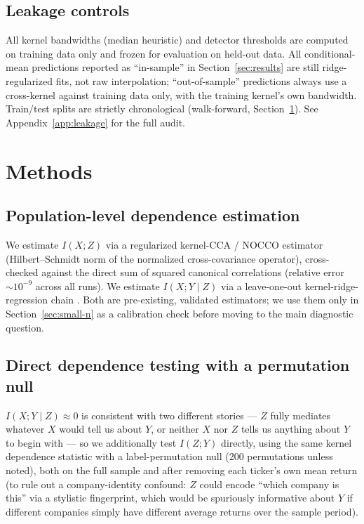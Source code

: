 \documentclass[11pt]{article}
\begin{document}
\subsection{Leakage controls}

All kernel bandwidths (median heuristic) and detector thresholds are computed on training data only and frozen for evaluation on held-out data. All conditional-mean predictions reported as ``in-sample'' in Section~\ref{sec:results} are still ridge-regularized fits, not raw interpolation; ``out-of-sample'' predictions always use a cross-kernel against training data only, with the training kernel's own bandwidth. Train/test splits are strictly chronological (walk-forward, Section~\ref{sec:methods}). See Appendix~\ref{app:leakage} for the full audit.

\section{Methods}
\label{sec:methods}

\subsection{Population-level dependence estimation}

We estimate $I(X;Z)$ via a regularized kernel-CCA / NOCCO estimator (Hilbert--Schmidt norm of the normalized cross-covariance operator), cross-checked against the direct sum of squared canonical correlations (relative error $\sim 10^{-9}$ across all runs). We estimate $I(X;Y\mid Z)$ via a leave-one-out kernel-ridge-regression chain \citep{rifkin2004defense}. Both are pre-existing, validated estimators; we use them only in Section~\ref{sec:small-n} as a calibration check before moving to the main diagnostic question.

\subsection{Direct dependence testing with a permutation null}

$I(X;Y\mid Z)\approx 0$ is consistent with two different stories --- $Z$ fully mediates whatever $X$ would tell us about $Y$, or neither $X$ nor $Z$ tells us anything about $Y$ to begin with --- so we additionally test $I(Z;Y)$ directly, using the same kernel dependence statistic with a label-permutation null (200 permutations unless noted), both on the full sample and after removing each ticker's own mean return (to rule out a company-identity confound: $Z$ could encode ``which company is this'' via a stylistic fingerprint, which would be spuriously informative about $Y$ if different companies simply have different average returns over the sample period).
\end{document}
